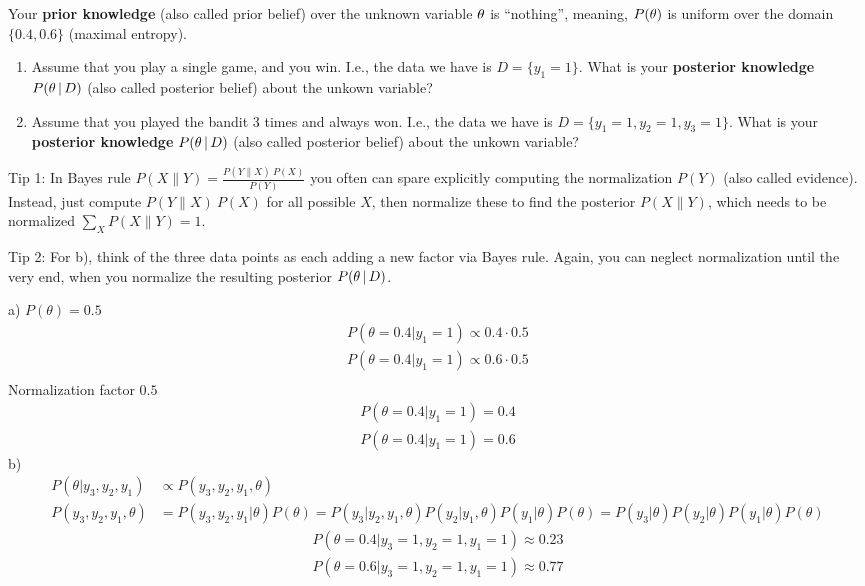 Your \textbf{prior knowledge} (also called prior belief) over the unknown variable $\theta$ is ``nothing'', meaning, $P(\theta)$ is uniform over the domain $\{0.4, 0.6\}$ (maximal entropy).

\begin{enumerate}
\item Assume that you play a single game, and you win. I.e., the data we have is $D = \{ y_1=1 \}$. What is your \textbf{posterior knowledge} $P(\theta \,|\, D)$ (also called posterior belief) about the unkown variable?

\item Assume that you played the bandit 3 times and always won. I.e., the data we have is $D = \{ y_1=1, y_2=1, y_3=1 \}$. What is your \textbf{posterior knowledge} $P(\theta \,|\, D)$ (also called posterior belief) about the unkown variable?
\end{enumerate}

Tip 1: In Bayes rule $P(X \| Y) = \frac{P(Y \| X)~ P(X)}{P(Y)}$ you often can spare explicitly computing the normalization $P(Y)$ (also called evidence). Instead, just compute $P(Y \| X)~ P(X)$ for all possible $X$, then normalize these to find the posterior $P(X \| Y)$, which needs to be normalized $\sum_X P(X \| Y) = 1$.

Tip 2: For b), think of the three data points as each adding a new factor via Bayes rule. Again, you can neglect normalization until the very end, when you normalize the resulting posterior $P(\theta \,|\, D)$.


\begin{solution}
	a)
	$P(\theta) = 0.5$
	\begin{align}
		P(\theta = 0.4 | y_1 = 1) \propto 0.4 \cdot 0.5\\
		P(\theta = 0.4 | y_1 = 1) \propto 0.6 \cdot 0.5\\
	\end{align}
	Normalization factor $0.5$
	\begin{align}
		P(\theta = 0.4 | y_1 = 1) = 0.4\\
		P(\theta = 0.4 | y_1 = 1) = 0.6
	\end{align}
	b)
	\begin{align}
		P(\theta|y_3, y_2, y_1) &\propto P(y_3, y_2, y_1, \theta)\\
		P(y_3, y_2, y_1, \theta) &= P(y_3, y_2, y_1 | \theta) P(\theta) = P(y_3 | y_2, y_1, \theta)P(y_2 | y_1, \theta) P(y_1 | \theta)P(\theta) = P(y_3 | \theta)P(y_2 | \theta)P(y_1 | \theta)P(\theta)
	\end{align}
	\begin{align}
		P(\theta = 0.4| y_3=1, y_2=1, y_1=1) \approx 0.23\\
		P(\theta = 0.6| y_3=1, y_2=1, y_1=1) \approx 0.77\\
	\end{align}
\end{solution}

